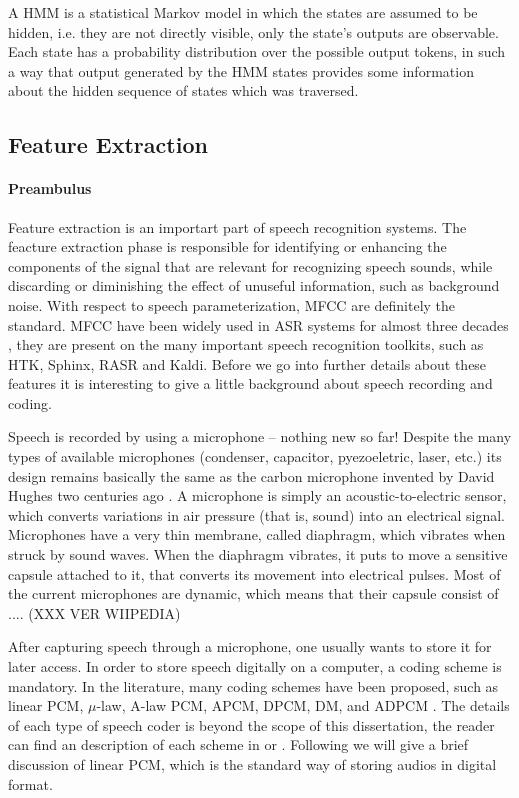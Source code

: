A \ac{HMM} is a statistical Markov model in which the states are assumed to be hidden, i.e. they are
not directly visible, only the state's outputs are observable. Each state has a probability distribution 
over the possible output tokens, in such a way that output generated by the HMM states provides some information
about the hidden sequence of states which was traversed.

\subsection{Feature Extraction}

\paragraph{Preambulus}
Feature extraction is an importart part of speech recognition systems. The feacture extraction 
phase is responsible for identifying or enhancing the components of the signal that are relevant 
for recognizing speech sounds, while discarding or diminishing the effect of unuseful information, 
such as background noise. With respect to speech parameterization, \ac{MFCC} are definitely the
standard. \ac{MFCC} have been widely used in \ac{ASR} systems for almost three decades \cite{Davis1980}, 
they are present on the many important speech recognition toolkits, such as \ac{HTK}, Sphinx, \ac{RASR} and Kaldi.
Before we go into further details about these features it is interesting to give a little background 
about speech recording and coding.

Speech is recorded by using a microphone -- nothing new so far!
Despite the many types of available microphones (condenser, capacitor, pyezoeletric, laser, etc.) its design
remains basically the same as the carbon microphone invented by David Hughes two centuries ago \cite{Robjohns2010}.
A microphone is simply an acoustic-to-electric sensor, which converts variations in air pressure (that is, sound)
into an electrical signal. Microphones have a very thin membrane, called diaphragm, which vibrates when struck by 
sound waves.  When the diaphragm vibrates, it puts to move a sensitive capsule attached to it, 
that converts its movement into electrical pulses. Most of the current microphones are dynamic, which means 
that their capsule consist of  .... (XXX VER WIIPEDIA)

After capturing speech through a microphone, one usually wants to store it for later access. In order
to store speech digitally on a computer, a coding scheme is mandatory. In the literature, many coding schemes have
been proposed, such as linear PCM, $\mu$-law, A-law PCM, APCM, DPCM, DM, and ADPCM \cite{Huang2001}. The details of 
each type of speech coder is beyond the scope of this dissertation, the reader can 
find an description of each scheme in \citeauthor{Huang2001} \citep{Huang2001} or \citeauthor{Furui2001} \citep{Furui2001}. 
Following we will give a brief discussion of linear PCM, which is the standard way of storing audios in digital format. 

